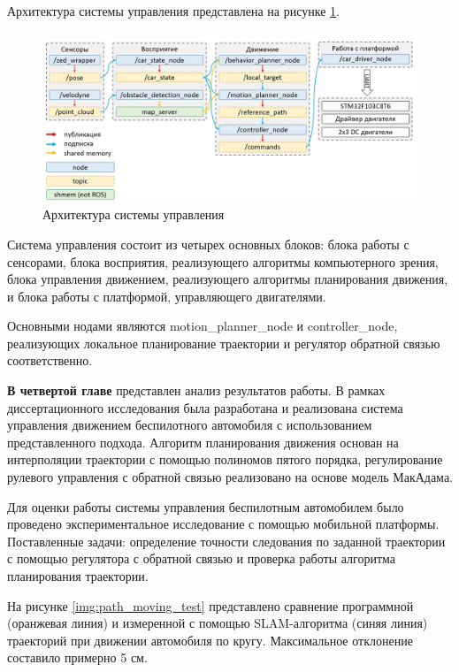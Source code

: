 Архитектура системы управления представлена на рисунке \ref{img:ros_arch}.

\begin{figure}[h]
    \centering
    \includegraphics[width=\textwidth]{images/ros_arch}
    \caption{Архитектура системы управления}
    \label{img:ros_arch}
\end{figure}

Система управления состоит из четырех основных блоков: блока работы с сенсорами, блока восприятия,
реализующего алгоритмы компьютерного зрения, блока управления движением, реализующего алгоритмы
планирования движения, и блока работы с платформой, управляющего двигателями.

Основными нодами являются motion\_planner\_node и controller\_node, реализующих локальное планирование
траектории и регулятор обратной связью соответственно.

\textbf{В четвертой главе} представлен анализ результатов работы. В рамках диссертационного исследования
была разработана и реализована система управления движением беспилотного автомобиля с использованием
представленного подхода. Алгоритм планирования движения основан на интерполяции траектории с помощью
полиномов пятого порядка, регулирование рулевого управления с обратной связью реализовано на основе
модель МакАдама.

Для оценки работы системы управления беспилотным автомобилем было проведено экспериментальное исследование
с помощью мобильной платформы. Поставленные задачи: определение точности следования по заданной траектории
с помощью регулятора с обратной связью и проверка работы алгоритма планирования траектории.

На рисунке \ref{img:path_moving_test} представлено сравнение программной (оранжевая линия)
и измеренной с помощью SLAM-алгоритма (синяя линия) траекторий при движении автомобиля по кругу.
Максимальное отклонение составило примерно 5 см.

